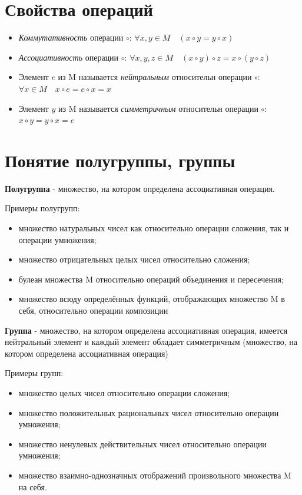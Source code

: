 \documentclass[a4paper]{article}
\begin{document}
{\begin{small}
\section*{Свойства операций}
\begin{itemize}
\item \textit{Коммутативность} операции $\circ$: $\forall x, y \in M \quad (x \circ y = y \circ x)$
\item \textit{Ассоциативность} операции $\circ$: $\forall x, y, z \in M \quad (x \circ y) \circ z = x \circ (y \circ z)$
\item Элемент $e$ из M называется \textit{нейтральным} относительн операции $\circ$: $\forall x \in M \quad x \circ e = e \circ x = x$
\item Элемент $y$ из M называется \textit{симметричным} относительн операции $\circ$: $x \circ y = y \circ x = e$
\end{itemize}

\section*{Понятие полугруппы, группы}
\textbf{Полугруппа} - множество, на котором определена ассоциативная операция.

Примеры полугрупп:
\begin{itemize}
\item множество натуральных чисел как относительно операции сложения, так и
операции умножения;
\item множество отрицательных целых чисел относительно сложения;
\item булеан множества M относительно операций объединения и пересечения;
\item множество всюду определённых функций, отображающих множество M в
себя, относительно операции композиции
\end{itemize}

\textbf{Группа} - множество, на котором определена ассоциативная операция, имеется нейтральный элемент и каждый элемент обладает симметричным (множество, на котором определена ассоциативная операция)

Примеры групп:
\begin{itemize}
\item множество целых чисел относительно операции сложения;
\item множество положительных рациональных чисел относительно операции
умножения;
\item множество ненулевых действительных чисел относительно операции
умножения;
\item множество взаимно-однозначных отображений произвольного множества M на себя.
\end{itemize}


\end{small}}
\end{document}
